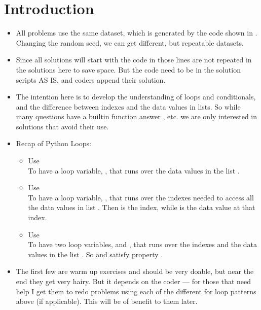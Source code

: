 \documentclass{coderdojo}
\begin{document}
\maketitle

\section*{Introduction}


\begin{itemize}
\item
All problems use the same dataset, which is generated by the code shown in . Changing the random seed, we can get different, but repeatable datasets.  
\item
Since all solutions will start with the code in  those lines are not repeated in the solutions here to save space. But the code need to be in the solution scripts AS IS, and coders append their solution. 
\item The intention here is to develop the understanding of loops and conditionals, and the difference between indexes and the data values in lists. So while many questions have a builtin function answer ,  etc.  we are only interested in solutions that avoid their use.
\item Recap of Python Loops:
\begin{itemize}
\item Use \\
To have a loop variable, , that runs over the data values in the list .
\item Use \\
To have a loop variable, , that runs over the indexes needed to access all the data values in list . Then  is the index, while  is the data value at that index.
\item Use \\
To have two loop variables,  and , that runs over the indexes and the data values in the list .  So  and  satisfy property .
\end{itemize}

\item The first few are warm up exercises and should be very doable, but near the end they get very hairy.  But it depends on the coder --- for those that need help I get them to redo problems using each of the different for loop patterns above (if applicable).  This will be of benefit to them later.
\end{itemize}
\end{document}
